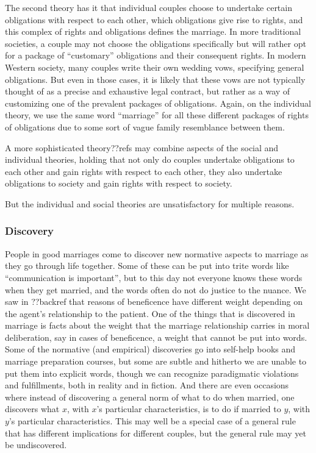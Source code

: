 The second theory has it that individual couples choose to undertake certain obligations with respect to each other, which obligations give rise to rights,
and this complex of rights and obligations defines the marriage. In more traditional societies, a couple may not choose the obligations specifically
but will rather opt for a package of ``customary'' obligations and their consequent rights. In modern Western society, many couples write their own
wedding vows, specifying general obligations. But even in those cases, it is likely that these vows are not typically thought of as a precise and exhaustive
legal contract, but rather as a way of customizing one of the prevalent packages of obligations. Again, on the individual theory, we use the same word
``marriage'' for all these different packages of rights of obligations due to some sort of vague family resemblance between them.

A more sophisticated theory??refs may combine aspects of the social and individual theories, holding that not only do couples undertake obligations to each other and gain
rights with respect to each other, they also undertake obligations to society and gain rights with respect to society.

But the individual and social theories are unsatisfactory for multiple reasons.

\subsubsection{Discovery}
People in good marriages come to discover new normative aspects to marriage as they go through life together.
Some of these can be put into trite words like ``communication is important'', but to this day not everyone knows these
words when they get married, and the words often do not do justice to the nuance. We 
saw in ??backref that reasons of beneficence have different weight depending on the agent's relationship to the
patient. One of the things that is discovered in marriage is facts about the weight that the marriage relationship
carries in moral deliberation, say in cases of beneficence, a weight that cannot be put into words. Some of the 
normative (and empirical) discoveries go into self-help books and marriage preparation courses, but some are
subtle and hitherto we are unable to put them into explicit words, though we can recognize paradigmatic violations and
fulfillments, both in reality and in fiction. And there are even occasions where instead of discovering
a general norm of what to do when married, one discovers what $x$, with $x$'s particular characteristics, is 
to do if married to $y$, with $y$'s particular characteristics. This may well be a special case of a general rule that 
has different implications for different couples, but the general rule may yet be undiscovered.

